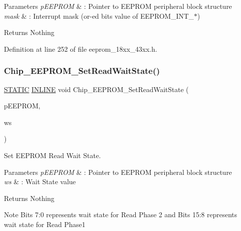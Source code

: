 \begin{DoxyParams}{Parameters}
{\em p\+E\+E\+P\+R\+OM} & \+: Pointer to E\+E\+P\+R\+OM peripheral block structure \\
\hline
{\em mask} & \+: Interrupt mask (or-\/ed bits value of E\+E\+P\+R\+O\+M\+\_\+\+I\+N\+T\+\_\+$\ast$) \\
\hline
\end{DoxyParams}
\begin{DoxyReturn}{Returns}
Nothing 
\end{DoxyReturn}


Definition at line 252 of file eeprom\+\_\+18xx\+\_\+43xx.\+h.

\mbox{\label{group___e_e_p_r_o_m__18_x_x__43_x_x_gaebadf781a37193e0cc84746da5c96b12}} 
\subsubsection{\texorpdfstring{Chip\+\_\+\+E\+E\+P\+R\+O\+M\+\_\+\+Set\+Read\+Wait\+State()}{Chip\_EEPROM\_SetReadWaitState()}}
{\footnotesize\ttfamily \hyperlink{group___l_p_c___types___public___macros_ga10b2d890d871e1489bb02b7e70d9bdfb}{S\+T\+A\+T\+IC} \hyperlink{spifi__18xx__43xx_8h_a2eb6f9e0395b47b8d5e3eeae4fe0c116}{I\+N\+L\+I\+NE} void Chip\+\_\+\+E\+E\+P\+R\+O\+M\+\_\+\+Set\+Read\+Wait\+State (\begin{DoxyParamCaption}\item[{\hyperlink{struct_l_p_c___e_e_p_r_o_m___t}{L\+P\+C\+\_\+\+E\+E\+P\+R\+O\+M\+\_\+T} $\ast$}]{p\+E\+E\+P\+R\+OM,  }\item[{uint32\+\_\+t}]{ws }\end{DoxyParamCaption})}



Set E\+E\+P\+R\+OM Read Wait State. 


\begin{DoxyParams}{Parameters}
{\em p\+E\+E\+P\+R\+OM} & \+: Pointer to E\+E\+P\+R\+OM peripheral block structure \\
\hline
{\em ws} & \+: Wait State value \\
\hline
\end{DoxyParams}
\begin{DoxyReturn}{Returns}
Nothing 
\end{DoxyReturn}
\begin{DoxyNote}{Note}
Bits 7\+:0 represents wait state for Read Phase 2 and Bits 15\+:8 represents wait state for Read Phase1 
\end{DoxyNote}


